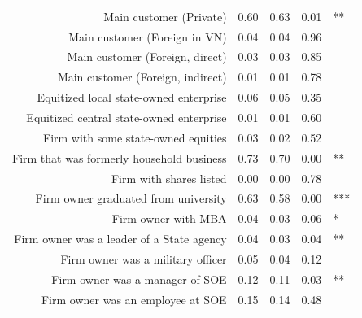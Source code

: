 \documentclass{beamer}
\begin{document}
\begin{frame}
{\begin{tabular}{rrrrl}
  Main customer (Private) & 0.60 & 0.63 & 0.01 & ** \\ 
  Main customer (Foreign in VN) & 0.04 & 0.04 & 0.96 &  \\ 
  Main customer (Foreign, direct) & 0.03 & 0.03 & 0.85 &  \\ 
  Main customer (Foreign, indirect) & 0.01 & 0.01 & 0.78 &  \\ 
  Equitized local state-owned enterprise & 0.06 & 0.05 & 0.35 &  \\ 
  Equitized central state-owned enterprise & 0.01 & 0.01 & 0.60 &  \\ 
  Firm with some state-owned equities & 0.03 & 0.02 & 0.52 &  \\ 
  Firm that was formerly household business & 0.73 & 0.70 & 0.00 & ** \\ 
  Firm with shares listed & 0.00 & 0.00 & 0.78 &  \\ 
  Firm owner graduated from university & 0.63 & 0.58 & 0.00 & *** \\ 
  Firm owner with MBA & 0.04 & 0.03 & 0.06 & * \\ 
  Firm owner was a leader of a State agency & 0.04 & 0.03 & 0.04 & ** \\ 
  Firm owner was a military officer & 0.05 & 0.04 & 0.12 &  \\ 
  Firm owner was a manager of SOE & 0.12 & 0.11 & 0.03 & ** \\ 
  Firm owner was an employee at SOE & 0.15 & 0.14 & 0.48 &  \\ 
   \hline
\end{tabular}          
}
\end{frame}
\end{document}
